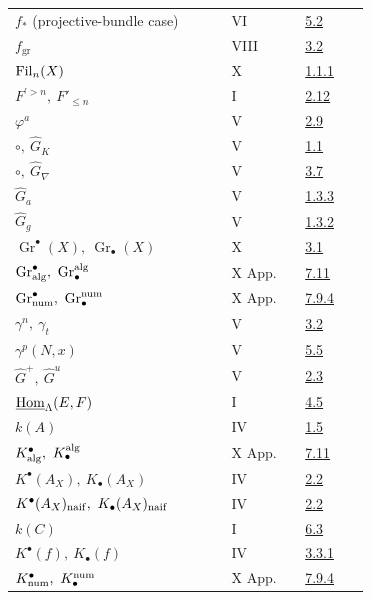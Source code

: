 \begin{longtable}{@{}>{\raggedright\arraybackslash}p{0.50\linewidth}>{\raggedright\arraybackslash}p{0.17\linewidth}>{\raggedright\arraybackslash}p{0.15\linewidth}@{}}
\(f_*\) (projective-bundle case) & VI & \hyperlink{sga6.e06.sec.5.2}{5.2}\\
\(f_{\operatorname{gr}}\) & VIII & \hyperlink{sga6.e08.prop.3-2}{3.2}\\
\(\operatorname{Fil}_n(X)\) & X & \hyperlink{sga6.e10.def.1-1-1}{1.1.1}\\
\(F^{\prime >n},\ F'_{\leq n}\) & I & \hyperlink{sga6.e01.prop.2-12}{2.12}\\
\(\varphi^a\) & V & \hyperlink{sga6.e05.para.2-9}{2.9}\\
\(\circ,\ \widehat G_K\) & V & \hyperlink{sga6.e05.para.1-1}{1.1}\\
\(\circ,\ \widehat G_{\nabla}\) & V & \hyperlink{sga6.e05.para.3-7}{3.7}\\
\(\widehat G_a\) & V & \hyperlink{sga6.e05.para.1-3}{1.3.3}\\
\(\widehat G_g\) & V & \hyperlink{sga6.e05.para.1-3}{1.3.2}\\
\(\operatorname{Gr}^\bullet(X),\ \operatorname{Gr}_\bullet(X)\) & X & \hyperlink{sga6.e10.sec.3.1}{3.1}\\
\(\operatorname{Gr}^\bullet_{\alg},\ \operatorname{Gr}^{\alg}_\bullet\) & X App. & \hyperlink{sga6.e10.para.7-11}{7.11}\\
\(\operatorname{Gr}^\bullet_{\num},\ \operatorname{Gr}^{\num}_\bullet\) & X App. & \hyperlink{sga6.e10.para.7-9-4}{7.9.4}\\
\(\gamma^n,\ \gamma_t\) & V & \hyperlink{sga6.e05.prop.3-2}{3.2}\\
\(\gamma^p(N,x)\) & V & \hyperlink{sga6.e05.para.5-5}{5.5}\\
\(\widehat G^+,\ \widehat G^u\) & V & \hyperlink{sga6.e05.para.2-3}{2.3}\\
\(\underline{\operatorname{Hom}}_{\Lambda}(E,F)\) & I & \hyperlink{sga6.e01.notation.4-5}{4.5}\\
\(k(A)\) & IV & \hyperlink{sga6.e04.para.1-5}{1.5}\\
\(K^\bullet_{\operatorname{alg}},\ K^{\operatorname{alg}}_\bullet\) & X App. & \hyperlink{sga6.e10.para.7-11}{7.11}\\
\(K^\bullet(A_X),\ K_\bullet(A_X)\) & IV & \hyperlink{sga6.e04.def.2-2}{2.2}\\
\(K^\bullet(A_X)_{\naif},\ K_\bullet(A_X)_{\naif}\) & IV & \hyperlink{sga6.e04.def.2-2}{2.2}\\
\(k(C)\) & I & \hyperlink{sga6.e01.para.6-3}{6.3}\\
\(K^\bullet(f),\ K_\bullet(f)\) & IV & \hyperlink{sga6.e04.para.3-3-1}{3.3.1}\\
\(K^\bullet_{\operatorname{num}},\ K^{\operatorname{num}}_\bullet\) & X App. & \hyperlink{sga6.e10.para.7-9-4}{7.9.4}\\

\end{longtable}
